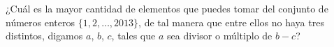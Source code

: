 ¿Cuál es la mayor cantidad de elementos que puedes tomar del conjunto de números enteros $\{1, 2, \dots , 2013\}$, de tal manera que entre ellos no haya tres distintos, digamos $a$, $b$, $c$, tales que $a$ sea divisor o múltiplo de $b - c$?